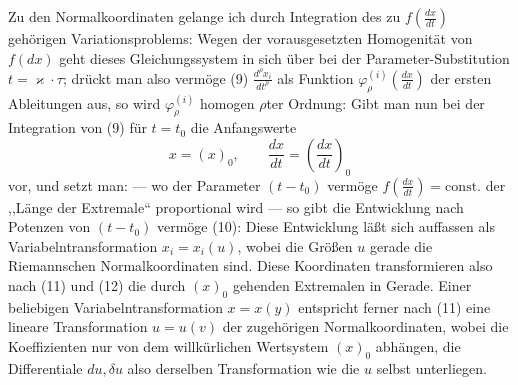 Zu den Normalkoordinaten gelange ich durch Integration des zu
\(f\!\left(\frac{dx}{dt}\right)\) gehörigen Variationsproblems:
Wegen der vorausgesetzten Homogenität von \(f(dx)\) geht dieses
Gleichungssystem in sich über bei der Parameter-Substitution
\(t=\varkappa\cdot\tau\); drückt man also vermöge (9)
\(\frac{d^\rho x_i}{dt^\rho}\) als Funktion
\(\varphi_\rho^{(i)}\!\left(\frac{dx}{dt}\right)\) der ersten
Ableitungen aus, so wird \(\varphi_\rho^{(i)}\) homogen \(\rho\)ter
Ordnung:
Gibt man nun bei der Integration von (9) für \(t=t_0\) die Anfangswerte
\[
x=(x)_0,\qquad \frac{dx}{dt}=\left(\frac{dx}{dt}\right)_0
\]
vor, und setzt man:
--- wo der Parameter \((t-t_0)\) vermöge
\(f\!\left(\frac{dx}{dt}\right)=\mathrm{const.}\) der ,,Länge der
Extremale`` proportional wird --- so gibt die Entwicklung nach Potenzen
von \((t-t_0)\) vermöge (10):
Diese Entwicklung läßt sich auffassen als Variabelntransformation
\(x_i=x_i(u)\), wobei die Größen \(u\) gerade die Riemannschen
Normalkoordinaten sind. Diese Koordinaten transformieren also nach
(11) und (12) die durch \((x)_0\) gehenden Extremalen in Gerade. Einer
beliebigen Variabelntransformation \(x=x(y)\) entspricht ferner nach
(11) eine lineare Transformation \(u=u(v)\) der zugehörigen
Normalkoordinaten, wobei die Koeffizienten nur von dem willkürlichen
Wertsystem \((x)_0\) abhängen, die Differentiale \(du,\delta u\) also
derselben Transformation wie die \(u\) selbst unterliegen.

